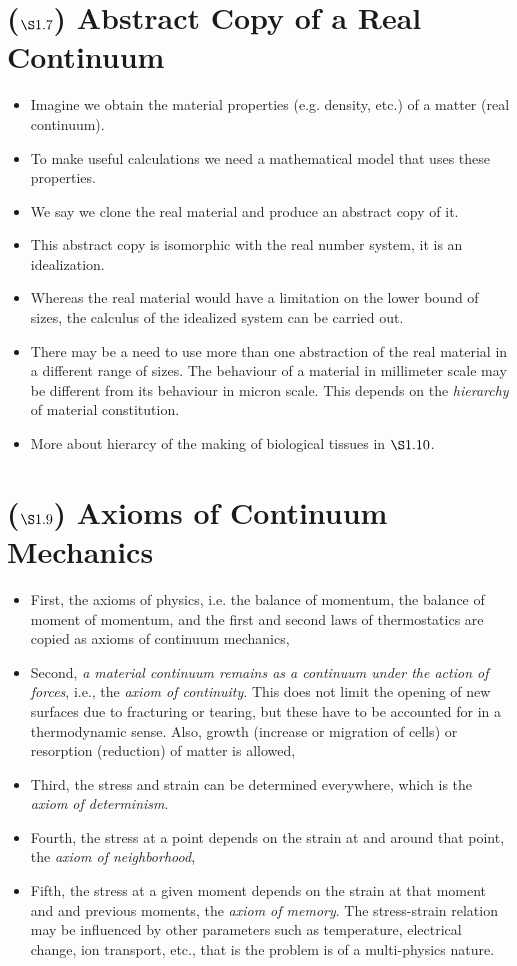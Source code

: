 \documentclass[11pt]{article}
\begin{document}
\section*{(\(\S 1.7\)) Abstract Copy of a Real Continuum}
\label{sec:orgef77cdd}
\begin{itemize}
\item Imagine we obtain the material properties (e.g. density, etc.) of a matter (real continuum).
\item To make useful calculations we need a mathematical model that uses these properties.
\item We say we clone the real material and produce an abstract copy of it.
\item This abstract copy is isomorphic with the real number system, it is an idealization.
\item Whereas the real material would have a limitation on the lower bound of sizes, the calculus of the idealized system can be carried out.
\item There may be a need to use more than one abstraction of the real material in a different range of sizes. The behaviour of a material in millimeter scale may be different from its behaviour in micron scale. This depends on the \emph{hierarchy} of material constitution.
\item More about hierarcy of the making of biological tissues in \(\S 1.10\).
\end{itemize}
\section*{(\(\S 1.9\)) Axioms of Continuum Mechanics}
\label{sec:orge95a203}
\begin{itemize}
\item First, the axioms of physics, i.e. the balance of momentum, the balance of moment of momentum, and the first and second laws of thermostatics are copied as axioms of continuum mechanics,
\item Second, \emph{a material continuum remains as a continuum under the action of forces}, i.e., the \emph{axiom of continuity}. This does not limit the opening of new surfaces due to fracturing or tearing, but these have to be accounted for in a thermodynamic sense. Also, growth (increase or migration of cells) or resorption (reduction) of matter is allowed,
\item Third, the stress and strain can be determined everywhere, which is the \emph{axiom of determinism}.
\item Fourth, the stress at a point depends on the strain at and around that point, the \emph{axiom of neighborhood},
\item Fifth, the stress at a given moment depends on the strain at that moment and and previous moments, the \emph{axiom of memory}. The stress-strain relation may be influenced by other parameters such as temperature, electrical change, ion transport, etc., that is the problem is of a multi-physics nature.
\end{itemize}
\end{document}
